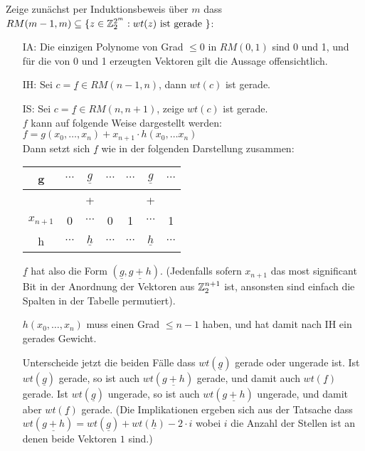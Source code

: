 Zeige zunächst per Induktionsbeweis über $m$ dass $RM(m-1,m) \subseteq \lbrace z \in \mathbb{Z}^{2^m}_2 : wt(z) \text{ ist gerade } \rbrace$:
\begin{itemize}
	\item[IA:] Die einzigen Polynome von Grad $\leq 0$ in $RM(0,1)$ sind 0 und 1, und für die von 0 und 1 erzeugten Vektoren gilt die Aussage offensichtlich.
	\item[IH:] Sei $c = \underline{f} \in RM(n-1,n)$, dann $wt(c)$ ist gerade.
	\item[IS:] Sei $c = \underline{f} \in RM(n,n+1)$, zeige $wt(c)$ ist gerade.\\
	$f$ kann auf folgende Weise dargestellt werden:\\
	$f = g(x_0,\ldots,x_n) + x_{n+1}\cdot h(x_0,\ldots x_n)$\\
	Dann setzt sich $\underline{f}$ wie in der folgenden Darstellung zusammen:\\
	\begin{tabular}{|c|ccc|ccc|}
	\hline 
	g & $\cdots$ & $\underline{g}$ & $\cdots$ & $\cdots$ & $\underline{g}$ & $\cdots$ \\ 
	\hline 
	 &  & + &  &  & + &  \\ 
	\hline 
	$x_{n+1}$ & 0 & $\cdots$ & 0 & 1 & $\cdots$ & 1 \\ 
	\hline 
	h & $\cdots$ & $\underline{h}$ & $\cdots$ & $\cdots$ & $\underline{h}$ & $\cdots$ \\ 
	\hline
	\end{tabular}
	
	$\underline{f}$ hat also die Form $(\underline{g}, \underline{g+h})$.
	(Jedenfalls sofern $x_{n+1}$ das most significant Bit in der Anordnung der Vektoren aus $\mathbb{Z}_2^{n+1}$ ist, ansonsten sind einfach die Spalten in der Tabelle permutiert).\medskip
	
	$h(x_0,\ldots,x_n)$ muss einen Grad $\leq n-1$ haben, und hat damit nach IH ein gerades Gewicht.\medskip
	
	Unterscheide jetzt die beiden Fälle dass $wt(\underline{g})$ gerade oder ungerade ist.
	Ist $wt(\underline{g})$ gerade, so ist auch $wt(\underline{g+h})$ gerade, und damit auch $wt(\underline{f})$ gerade.
	Ist $wt(\underline{g})$ ungerade, so ist auch $wt(\underline{g+h})$ ungerade, und damit aber $wt(\underline{f})$ gerade.
	(Die Implikationen ergeben sich aus der Tatsache dass $wt(\underline{g + h}) = wt(\underline{g}) + wt(\underline{h}) - 2 \cdot i$ wobei $i$ die Anzahl der Stellen ist an denen beide Vektoren $1$ sind.)
\end{itemize}

